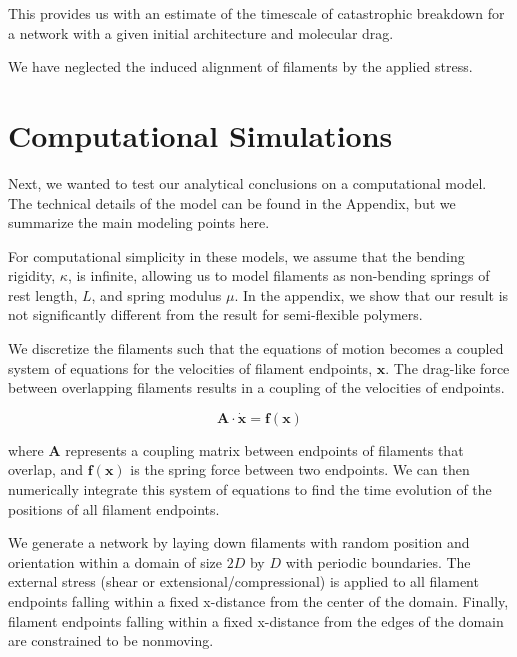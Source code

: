 \documentclass[prb,11pt]{revtex4-1}
\begin{document}
This provides us with an estimate of the timescale of catastrophic breakdown for a network with a given initial architecture and molecular drag.

We have neglected the induced alignment of filaments by the applied stress.  


\section{Computational Simulations}

Next, we wanted to test our analytical conclusions on a computational model.  The technical details of the model can be found in the Appendix, but we summarize the main modeling points here.

For computational simplicity in these models, we assume that the bending rigidity, $\kappa$, is infinite, allowing us to model filaments as non-bending springs of rest length, $L$, and spring modulus $\mu$.  In the appendix, we show that our result is not significantly different from the result for semi-flexible polymers.

We discretize the filaments such that the equations of motion becomes a coupled system of equations for the velocities of filament endpoints, $\mathbf{x}$.  The drag-like force between overlapping filaments results in a coupling of the velocities of endpoints.  

\begin{equation}
\mathbf{A \cdot \dot x} = \mathbf{f(x)}
\end{equation}

where $\mathbf{A }$ represents a coupling matrix between endpoints of filaments that overlap, and $\mathbf{f(x)}$ is the spring force between two endpoints.  We can then numerically integrate this system of equations to find the time evolution of the positions of all filament endpoints.

We generate a network by laying down filaments with random position and orientation within a domain of size $2D$ by $D$ with periodic boundaries.  The external stress (shear or extensional/compressional) is applied to all filament endpoints falling within a fixed x-distance from the center of the domain.  Finally, filament endpoints falling within a fixed x-distance from the edges of the domain are constrained to be nonmoving.
\end{document}
